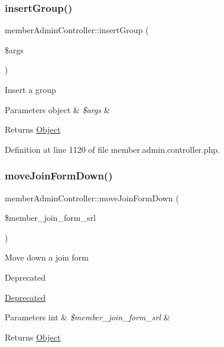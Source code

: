 \subsubsection{\texorpdfstring{insert\+Group()}{insertGroup()}}
{\footnotesize\ttfamily member\+Admin\+Controller\+::insert\+Group (\begin{DoxyParamCaption}\item[{}]{\$args }\end{DoxyParamCaption})}

Insert a group 
\begin{DoxyParams}[1]{Parameters}
object & {\em \$args} & \\
\hline
\end{DoxyParams}
\begin{DoxyReturn}{Returns}
\hyperlink{classObject}{Object} 
\end{DoxyReturn}


Definition at line 1120 of file member.\+admin.\+controller.\+php.

\hypertarget{classmemberAdminController_a07d6306d7ed6eadca11fdc8ca9eb10d4}{}\label{classmemberAdminController_a07d6306d7ed6eadca11fdc8ca9eb10d4} 
\subsubsection{\texorpdfstring{move\+Join\+Form\+Down()}{moveJoinFormDown()}}
{\footnotesize\ttfamily member\+Admin\+Controller\+::move\+Join\+Form\+Down (\begin{DoxyParamCaption}\item[{}]{\$member\+\_\+join\+\_\+form\+\_\+srl }\end{DoxyParamCaption})}

Move down a join form \begin{DoxyRefDesc}{Deprecated}
\item[\hyperlink{deprecated__deprecated000024}{Deprecated}]\end{DoxyRefDesc}

\begin{DoxyParams}[1]{Parameters}
int & {\em \$member\+\_\+join\+\_\+form\+\_\+srl} & \\
\hline
\end{DoxyParams}
\begin{DoxyReturn}{Returns}
\hyperlink{classObject}{Object} 
\end{DoxyReturn}


